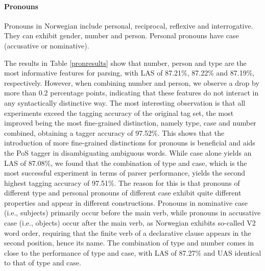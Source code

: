 \documentclass[11pt,a4paper]{article}
\begin{document}
\paragraph{Pronouns}
Pronouns in Norwegian include personal, reciprocal, reflexive and
interrogative. They can exhibit gender, number and person. Personal pronouns
have case (accusative or nominative).

The results in Table \ref{pronresults} show that number, person and type are
the most informative features for parsing, with LAS of 87.21\%, 87.22\% and
87.19\%, respectively. However, when combining number and person, we observe a
drop by more than 0.2 percentage points, indicating that these features do not
interact in any syntactically distinctive way. The most interesting observation
is that all experiments exceed the tagging accuracy of the original tag set,
the most improved being the most fine-grained distinction, namely type, case
and number combined, obtaining a tagger accuracy of 97.52\%. This shows that
the introduction of more fine-grained distinctions for pronouns is beneficial
and aids the PoS tagger in disambiguating ambiguous words. While case alone
yields an LAS of 87.08\%, we found that the combination of type and case, which
is the most successful experiment in terms of parser performance, yields the
second highest tagging accuracy of 97.51\%. The reason for this is that
pronouns of different type and personal pronouns of different case exhibit
quite different properties and appear in different constructions. Pronouns in
nominative case (i.e., subjects) primarily occur before the main verb, while
pronouns in accusative case (i.e., objects) occur after the main verb, as
Norwegian exhibits so-called V2 word order, requiring that the finite verb of a
declarative clause appears in the second position, hence its name. The
combination of type and number comes in close to the performance of type and
case, with LAS of 87.27\% and UAS identical to that of type and case.
\end{document}
